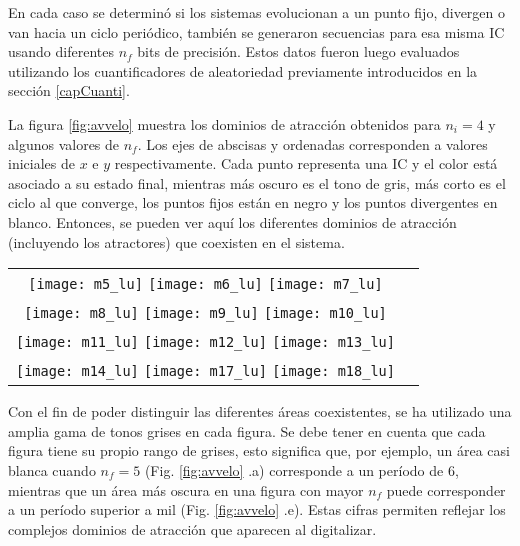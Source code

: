 En cada caso se determinó si los sistemas evolucionan a un punto fijo, divergen o van hacia un ciclo periódico, también se generaron secuencias para esa misma IC usando diferentes $n_f$ bits de precisión.
Estos datos fueron luego evaluados utilizando los cuantificadores de aleatoriedad previamente introducidos en la sección \ref{capCuanti}.

La figura \ref{fig:avvelo} muestra los dominios de atracción obtenidos para $n_i = 4$ y algunos valores de $n_f$.
Los ejes de abscisas y ordenadas corresponden a valores iniciales de $x$ e $y$ respectivamente.
Cada punto representa una IC y el color está asociado a su estado final, mientras más oscuro es el tono de gris, más corto es el ciclo al que converge, los puntos fijos están en negro y los puntos divergentes en blanco.
Entonces, se pueden ver aquí los diferentes dominios de atracción (incluyendo los atractores) que coexisten en el sistema.
%
\begin{figure*}
	\centering
	\begin{tabular}{cc}
		\texttt{[image: m5\_lu]}
		\texttt{[image: m6\_lu]}
		\texttt{[image: m7\_lu]}\\
		\texttt{[image: m8\_lu]}
		\texttt{[image: m9\_lu]}
		\texttt{[image: m10\_lu]}\\
		\texttt{[image: m11\_lu]}
		\texttt{[image: m12\_lu]}
		\texttt{[image: m13\_lu]}\\
		\texttt{[image: m14\_lu]}
		\texttt{[image: m17\_lu]}
		\texttt{[image: m18\_lu]}\\
	\end{tabular}
	\caption{Áreas coexistentes en el dominio de atracción para: (a) $n_f=5$, (b) $n_f=6$, (c) $n_f=7$, (d) $n_f=8$, (e) $n_f=9$, (f) $n_f=10$, (g) $n_f=11$, (h) $n_f=12$, (i) $n_f=13$, (j) $n_f=14$, (k) $n_f=17$, (l) $n_f=18$.}
	\label{fig:avvelo}
\end{figure*}

Con el fin de poder distinguir las diferentes áreas coexistentes, se ha utilizado una amplia gama de tonos grises en cada figura.
Se debe tener en cuenta que cada figura tiene su propio rango de grises, esto significa que, por ejemplo, un área casi blanca cuando $n_f = 5$ (Fig. \ref{fig:avvelo} .a) corresponde a un período de $6$, mientras que un área más oscura en una figura con mayor $n_f$ puede corresponder a un período superior a mil (Fig. \ref{fig:avvelo} .e).
Estas cifras permiten reflejar los complejos dominios de atracción que aparecen al digitalizar.

